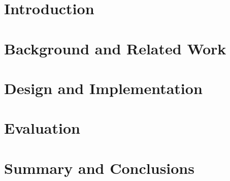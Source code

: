 \documentclass[a4paper,12pt,twoside,openright]{report}
\begin{document}
\pagestyle{empty}
\singlespacing

\onehalfspacing

\singlespacing


\setcounter{page}{0}
\pagestyle{plain}
\tableofcontents
\listoffigures
\listoftables
\onehalfspacing

\chapter{Introduction}
\setcounter{page}{1}
 

\chapter{Background and Related Work} 


\chapter{Design and Implementation} 

 
\chapter{Evaluation} 


\chapter{Summary and Conclusions} 


\appendix
\singlespacing

 
 
\end{document}
